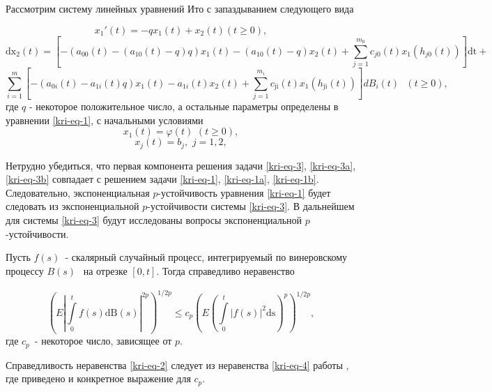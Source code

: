 Рассмотрим систему линейных уравнений Ито с запаздыванием следующего вида

\begin{equation*}
	x_1'(t)=-qx_1(t)+x_2(t)(t\ge 0),
\end{equation*}
\begin{equation}\label{kri-eq-3}
	\text{dx}_2(t)=\left[-(a_{00}(t)-(a_{10}(t)-q)q)x_1(t)-(a_{10}(t)-q)x_2(t)+\overset{m_0}{\underset{j=1}{\sum
	}}c_{\mathit{j0}}(t)x_1(h_{\mathit{j0}}(t))\right]\text{dt}+
\end{equation}
\begin{equation*}
\overset
	m{\underset{i=1}{\sum }}\left[-(a_{0i}(t)-a_{1i}(t)q)x_1(t)-a_{1i}(t)x_2(t)+\overset{m_i}{\underset{j=1}{\sum
	}}c_{\text{ji}}(t)x_1(h_{\text{ji}}(t))\right]\mathit{dB}_i(t)\text{  }(t\ge
	0),
\end{equation*}
где  $q$ - некоторое положительное число, а остальные параметры
определены в уравнении \eqref{kri-eq-1}, с начальными условиями
\begin{equation}\label{kri-eq-3a}
	x_1(t)=\varphi (t)\text{
	}(t\ge
	0),
\end{equation}
\begin{equation}\label{kri-eq-3b}
	x_j(t)=b_j,\text{
	}j=1,2,
\end{equation}

Нетрудно убедиться, что первая компонента решения задачи \eqref{kri-eq-3}, \eqref{kri-eq-3a}, \eqref{kri-eq-3b} совпадает с решением задачи \eqref{kri-eq-1}, \eqref{kri-eq-1a}, \eqref{kri-eq-1b}.
Следовательно, экспоненциальная  $p${}-\linebreak устойчивость уравнения \eqref{kri-eq-1} будет следовать из экспоненциальной
$p${}-устойчивости системы \eqref{kri-eq-3}. В дальнейшем для системы \eqref{kri-eq-3} будут исследованы вопросы экспоненциальной
$p${}-устойчивости.


\begin{lemma}
 Пусть  $f(s)$\ {}- скалярный случайный процесс, интегрируемый по винеровскому процессу  $B(s)$
\textsubscript{\ }на отрезке  $[0,t]$. Тогда справедливо неравенство

\begin{equation}\label{kri-eq-4}
	\left(E\left| \int\limits_{0}^{t} f(s)\text{dB}(s)\right|^{2p}\right)^{1/2p}\le
	c_p\left(E\left(\int\limits_{0}^{t} |f(s)|^2\text{ds}\right)^p\right)^{1/2p},
\end{equation}
где  $c_p$\ {}- некоторое число, зависящее от  $p$.
\end{lemma}
Справедливость неравенства \eqref{kri-eq-2} следует из неравенства \eqref{kri-eq-4} работы \cite[стр. 65]{kri-bib-18}, где приведено и конкретное выражение для
$c_p$.

